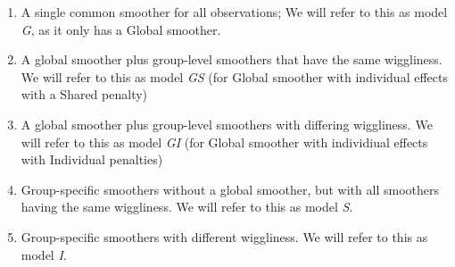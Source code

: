 \documentclass[12pt]{article}
\providecommand{\tightlist}{%
  \setlength{\itemsep}{0pt}\setlength{\parskip}{0pt}}
\begin{document}
\begin{enumerate}
\def\labelenumi{\arabic{enumi}.}
\tightlist
\item
  A single common smoother for all observations; We will refer to this
  as model \emph{G}, as it only has a Global smoother.
\item
  A global smoother plus group-level smoothers that have the same
  wiggliness. We will refer to this as model \emph{GS} (for Global
  smoother with individual effects with a Shared penalty)
\item
  A global smoother plus group-level smoothers with differing
  wiggliness. We will refer to this as model \emph{GI} (for Global
  smoother with individiual effects with Individual penalties)
\item
  Group-specific smoothers without a global smoother, but with all
  smoothers having the same wiggliness. We will refer to this as model
  \emph{S}.
\item
  Group-specific smoothers with different wiggliness. We will refer to
  this as model \emph{I}.
\end{enumerate}
\end{document}
